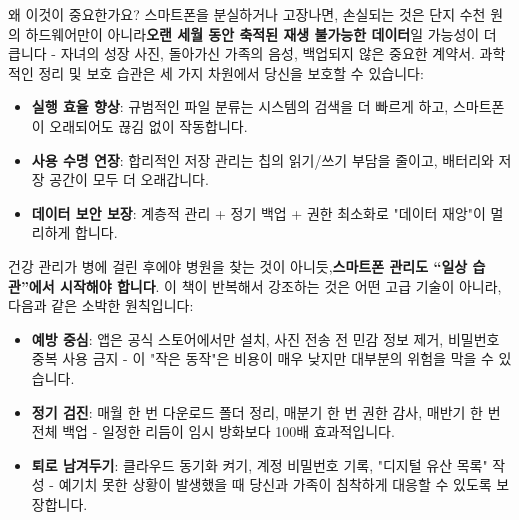 \begin{tcbinfo}{왜 이것이 중요한가요?}
스마트폰을 분실하거나 고장나면, 손실되는 것은 단지 수천 원의 하드웨어만이 아니라\textbf{오랜 세월 동안 축적된 재생 불가능한 데이터}일 가능성이 더 큽니다 - 자녀의 성장 사진, 돌아가신 가족의 음성, 백업되지 않은 중요한 계약서. 과학적인 정리 및 보호 습관은 세 가지 차원에서 당신을 보호할 수 있습니다:

\begin{itemize}
  \item \textbf{실행 효율 향상}: 규범적인 파일 분류는 시스템의 검색을 더 빠르게 하고, 스마트폰이 오래되어도 끊김 없이 작동합니다.
  \item \textbf{사용 수명 연장}: 합리적인 저장 관리는 칩의 읽기/쓰기 부담을 줄이고, 배터리와 저장 공간이 모두 더 오래갑니다.
  \item \textbf{데이터 보안 보장}: 계층적 관리 + 정기 백업 + 권한 최소화로 "데이터 재앙"이 멀리하게 합니다.
\end{itemize}

\end{tcbinfo}


건강 관리가 병에 걸린 후에야 병원을 찾는 것이 아니듯,\textbf{스마트폰 관리도 “일상 습관”에서 시작해야 합니다}. 이 책이 반복해서 강조하는 것은 어떤 고급 기술이 아니라, 다음과 같은 소박한 원칙입니다:

\begin{itemize}
  \item \textbf{예방 중심}: 앱은 공식 스토어에서만 설치, 사진 전송 전 민감 정보 제거, 비밀번호 중복 사용 금지 - 이 "작은 동작"은 비용이 매우 낮지만 대부분의 위험을 막을 수 있습니다.
  \item \textbf{정기 검진}: 매월 한 번 다운로드 폴더 정리, 매분기 한 번 권한 감사, 매반기 한 번 전체 백업 - 일정한 리듬이 임시 방화보다 100배 효과적입니다.
  \item \textbf{퇴로 남겨두기}: 클라우드 동기화 켜기, 계정 비밀번호 기록, "디지털 유산 목록" 작성 - 예기치 못한 상황이 발생했을 때 당신과 가족이 침착하게 대응할 수 있도록 보장합니다.
\end{itemize}
